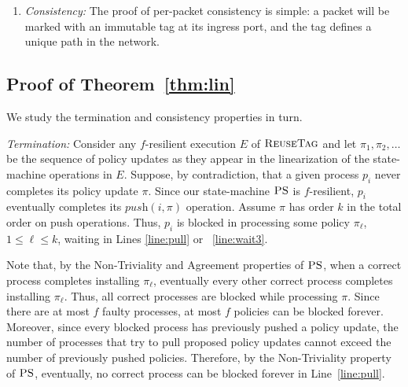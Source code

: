 \documentclass[11pt,pdftex,letter]{article}
\newcommand{\DPO}{\textsc{ReuseTag}}
\newcommand{\PS}{\textsc{PS}}
\begin{document}
\begin{appendix}
\begin{enumerate}
\item \emph{Consistency:} The proof of per-packet consistency is simple: a packet will be marked with an immutable
tag at its ingress port, and the tag defines a unique path in the network. 
\end{enumerate}


\subsection{Proof of Theorem~\ref{thm:lin}}

We study the termination and consistency properties in turn.

\emph{Termination:} Consider any $f$-resilient execution $E$ of $\DPO$ and let $\pi_1,\pi_2,\ldots$ be the
sequence of policy updates as they appear in the
linearization of the state-machine operations in $E$.
Suppose, by contradiction, that a given process $p_i$ never completes
its policy update  $\pi$.
Since our state-machine $\PS$ is $f$-resilient, $p_i$ eventually completes its
$\textit{push}(i,\pi)$ operation.
Assume $\pi$ has order $k$ in the total order on push operations.
Thus, $p_i$ is blocked in processing some policy $\pi_{\ell}$, $1\leq \ell \leq
k$,  waiting in Lines \ref{line:pull} or ~\ref{line:wait3}.

Note that, by the Non-Triviality and Agreement properties of $\PS$,
when a correct process completes installing $\pi_{\ell}$,
eventually every other correct process completes installing $\pi_{\ell}$.
Thus, all correct processes are blocked while processing $\pi$.
Since there are at most $f$ faulty processes, at most $f$ policies can
be blocked forever.
Moreover, since every blocked process has previously pushed a policy
update, the number of processes that try to pull proposed policy
updates
cannot exceed the number of previously pushed policies.
Therefore, by the Non-Triviality property of $\PS$,
eventually, no correct process  can be blocked forever in
Line~\ref{line:pull}.



\end{appendix}
\end{document}
